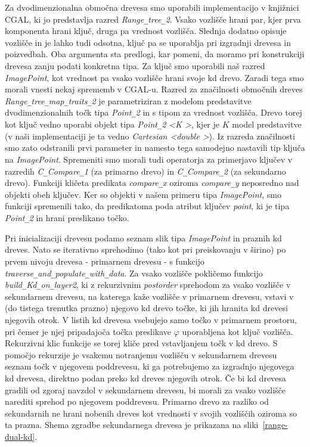 \documentclass[a4paper, 12pt]{book}
\newcommand{\U}{\texttt{\_}}
\begin{document}
Za dvodimenzionalna območna drevesa smo uporabili implementacijo v knjiž\-ni\-ci CGAL, ki jo predstavlja razred \textit{Range\texttt{\_}tree\texttt{\_}2}. Vsako vozlišče hrani par, kjer prva komponenta hrani ključ, druga pa vrednost vozlišča. Slednja dodatno opisuje vozlišče in je lahko tudi odsotna, ključ pa se uporablja pri izgradnji drevesa in poizvedbah. Oba argumenta sta predlogi, kar pomeni, da moramo pri konstrukciji drevesa zanju podati konkretna tipa. 
Za ključ smo uporabili naš razred \textit{ImagePoint}, kot vrednost pa vsako vozlišče hrani svoje kd drevo. Zaradi tega smo morali vnesti nekaj sprememb v CGAL-u. Razred za značilnosti območnih dreves \textit{Range\U tree\U map\U traits\U 2} je parametriziran z modelom predstavitve dvodimenzionalnih točk tipa \textit{Point\U 2} in s tipom za vrednost vozlišča. Drevo torej kot ključ vedno uporabi objekt tipa \textit{Point\U 2 \textless K \textgreater}, kjer je $K$ model predstavitve (v naši implementaciji je ta vedno \textit{Cartesian \textless double \textgreater}). Iz razreda značilnosti smo zato odstranili prvi parameter in namesto tega samodejno nastavili tip ključa na \textit{ImagePoint}. Spremeniti smo morali tudi operatorja za primerjavo ključev v razredih \textit{C\U Compare\U 1} (za primarno drevo) in \textit{C\U Compare\U 2} (za sekundarno drevo). Funkciji kličeta predikata \textit{compare\U x} oziroma \textit{compare\U y} neposredno nad objekti obeh ključev. Ker so objekti v našem primeru tipa \textit{ImagePoint}, smo funkciji spremenili tako, da predikatoma poda atribut ključev \textit{point}, ki je tipa \textit{Point\U 2} in hrani preslikano točko.

Pri inicializaciji drevesu podamo seznam slik tipa \textit{ImagePoint} in praznih kd dreves. Nato se iterativno sprehodimo (tako kot pri preiskovanju v širino) po prvem nivoju drevesa - primarnem drevesu - s funkcijo \textit{traverse\U and\U popu\-la\-te\U with\U data}. Za vsako vozlišče pokličemo funkcijo \textit{build\U Kd\U on\U la\-yer2}, ki z rekurzivnim \textit{postorder} sprehodom za vsako vozlišče v sekundarnem drevesu, na katerega kaže vozlišče v primarnem drevesu, vstavi v (do tistega trenutka prazno) njegovo kd drevo točke, ki jih hranita kd drevesi njegovih otrok. V listih kd drevesa vsebujejo samo točko v primarnem prostoru, pri čemer je njej pripadajoča točka preslikave $\varphi$ uporabljena kot ključ vozlišča. Rekurzivni klic funkcije se torej kliče pred vstavljanjem točk v kd drevo. S pomočjo rekurzije je vsakemu notranjemu vozlišču v sekundarnem drevesu seznam točk v njegovem poddrevesu, ki ga potrebujemo za izgradnjo njegovega kd drevesa, direktno podan preko kd dreves njegovih otrok. Če bi kd drevesa gradili od zgoraj navzdol v sekundarnem drevesu, bi morali za vsako vozlišče narediti sprehod po njegovem poddrevesu. Primarno drevo za razliko od sekundarnih ne hrani nobenih dreves kot vrednosti v svojih vozliščih oziroma so ta prazna. Shema zgradbe sekundarnega drevesa je prikazana na sliki~\ref{range-dual-kd}.
\end{document}
